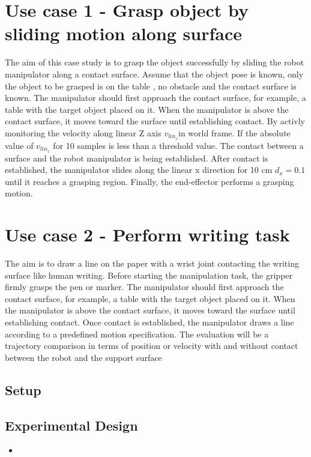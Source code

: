 \documentclass[report.tex]{subfiles}
\begin{document}
    \section{Use case 1 - Grasp object by sliding motion along surface} 
    The aim of this case study is to grasp the object successfully by sliding the robot
    manipulator along a contact surface. Assume that the object pose is known, 
    only the object to be grasped is on the table , no obstacle  and the contact surface is known.
    The manipulator should first approach the contact surface, for example, a table
    with the target object placed on it. When the manipulator is above the contact
    surface, it moves toward the surface until establishing contact. By activly monitoring the velocity along linear Z axis $v_{lin_z}$in world frame.
    If the absolute value of $v_{lin_z}$ for 10 samples is less than a threshold value. The contact between a surface and the robot manipulator is being established.
    After contact is established, the manipulator slides along the linear x direction for 10 cm $d_{x} = 0.1$ until it reaches a grasping
    region. Finally, the end-effector performs a grasping motion.


    \section{Use case 2 - Perform writing task} 
    The aim is to draw a line on the paper with a wrist joint contacting the writing
    surface like human writing. Before starting the manipulation task, the gripper
    firmly grasps the pen or marker. The manipulator should first approach the
    contact surface, for example, a table with the target object placed on it. When
    the manipulator is above the contact surface, it moves toward the surface until
    establishing contact. Once contact is established, the manipulator draws a line
    according to a predefined motion specification. The evaluation will be a trajectory
    comparison in terms of position or velocity with and without contact between the
    robot and the support surface
        \subsection{Setup}
        \subsection{Experimental Design}
        \begin{itemize}
            \item 
        \end{itemize}
\end{document}
